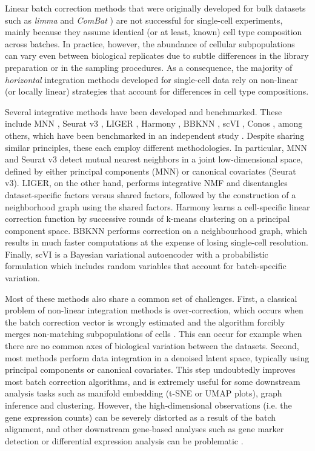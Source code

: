 Linear batch correction methods that were originally developed for bulk datasets such as \textit{limma} \cite{Ritchie2015b} and \textit{ComBat} \cite{Johnson2006}) are not successful for single-cell experiments, mainly because they assume identical (or at least, known) cell type composition across batches. In practice, however, the abundance of cellular subpopulations can vary even between biological replicates due to subtle differences in the library preparation or in the sampling procedures. As a consequence, the majority of \textit{horizontal} integration methods developed for single-cell data rely on non-linear (or locally linear) strategies that account for differences in cell type compositions.

Several integrative methods have been developed and benchmarked. These include MNN \cite{Haghverdi2018}, Seurat v3 \cite{Butler2018}, LIGER \cite{Welch2019}, Harmony \cite{Korsunsky2019}, BBKNN \cite{Polanski2019}, scVI \cite{Lopez2018}, Conos \cite{Barkas2019}, among others, which have been benchmarked in an independent study \cite{Luecken2020}. Despite sharing similar principles, these each employ different methodologies. In particular, MNN and Seurat v3 detect mutual nearest neighbors in a joint low-dimensional space, defined by either principal components (MNN) or canonical covariates (Seurat v3). LIGER, on the other hand, performs integrative NMF and disentangles dataset-specific factors versus shared factors, followed by the construction of a neighborhood graph using the shared factors. Harmony learns a cell-specific linear correction function by successive rounds of k-means clustering on a principal component space. BBKNN performs correction on a neighbourhood graph, which results in much faster computations at the expense of losing single-cell resolution. Finally, scVI is a Bayesian variational autoencoder with a probabilistic formulation which includes random variables that account for batch-specific variation.

Most of these methods also share a common set of challenges. First, a classical problem of non-linear integration methods is over-correction, which occurs when the batch correction vector is wrongly estimated and the algorithm forcibly merges non-matching subpopulations of cells \cite{Luecken2020}. This can occur for example when there are no common axes of biological variation between the datasets. Second, most methods perform data integration in a denoised latent space, typically using principal components or canonical covariates. This step undoubtedly improves most batch correction algorithms, and is extremely useful for some downstream analysis tasks such as manifold embedding (t-SNE or UMAP plots), graph inference and clustering. However, the high-dimensional observations (i.e. the gene expression counts) can be severely distorted as a result of the batch alignment, and other downstream gene-based analyses such as gene marker detection or differential expression analysis can be problematic \cite{Haghverdi2018}.

